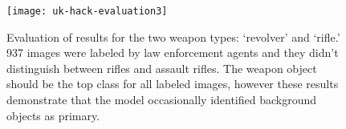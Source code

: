 \begin{figure}
	\texttt{[image: uk-hack-evaluation3]}
	\caption{Evaluation of results for the two weapon types: `revolver' and `rifle.' 937 images were labeled by law enforcement agents and they didn't distinguish between rifles and assault rifles. The weapon object should be the top class for all labeled images, however these results demonstrate that the model occasionally identified background objects as primary.}
	\label{fig:uk-hack-eval}
\end{figure}

